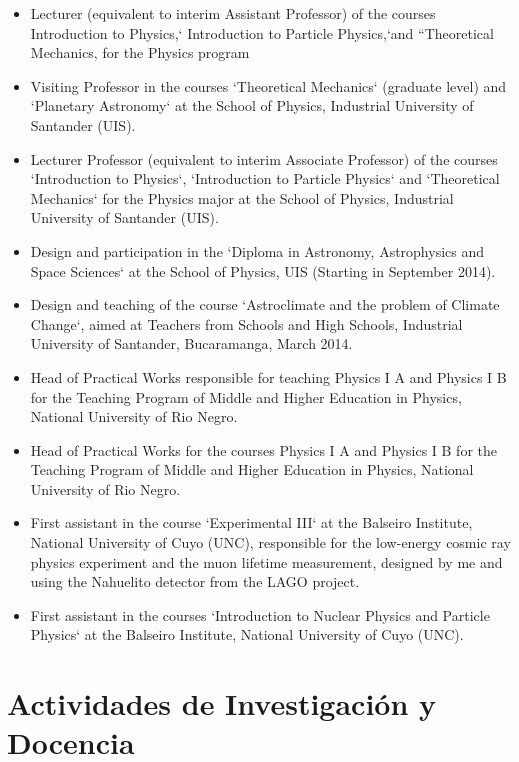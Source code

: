 \begin{itemize}
\item {} Lecturer (equivalent to interim Assistant Professor) of the courses Introduction to Physics,` Introduction to Particle Physics,`and ``Theoretical Mechanics, for the Physics program
\item {} Visiting Professor in the courses `Theoretical Mechanics` (graduate level) and `Planetary Astronomy` at the School of Physics, Industrial University of Santander (UIS).
\item {} Lecturer Professor (equivalent to interim Associate Professor) of the courses `Introduction to Physics`, `Introduction to Particle Physics` and `Theoretical Mechanics` for the Physics major at the School of Physics, Industrial University of Santander (UIS).
\item {} Design and participation in the `Diploma in Astronomy, Astrophysics and Space Sciences` at the School of Physics, UIS (Starting in September 2014).
\item {} Design and teaching of the course `Astroclimate and the problem of Climate Change`, aimed at Teachers from Schools and High Schools, Industrial University of Santander, Bucaramanga, March 2014.
\item {} Head of Practical Works responsible for teaching Physics I A and Physics I B for the Teaching Program of Middle and Higher Education in Physics, National University of Rio Negro.
\item {} Head of Practical Works for the courses Physics I A and Physics I B for the Teaching Program of Middle and Higher Education in Physics, National University of Rio Negro.
\item {} First assistant in the course `Experimental III` at the Balseiro Institute, National University of Cuyo (UNC), responsible for the low-energy cosmic ray physics experiment and the muon lifetime measurement, designed by me and using the Nahuelito detector from the LAGO project.
\item {} First assistant in the courses `Introduction to Nuclear Physics and Particle Physics` at the Balseiro Institute, National University of Cuyo (UNC).
\fi
\end{itemize}
\else

\section*{Actividades de Investigación y Docencia}


